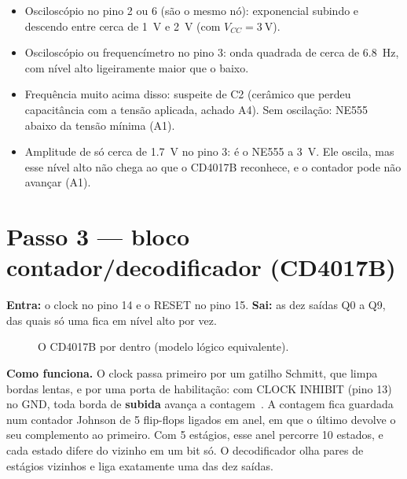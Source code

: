 \documentclass[11pt,a4paper]{article}
\begin{document}
\begin{medir}
\begin{itemize}[leftmargin=*]
  \item Osciloscópio no pino 2 ou 6 (são o mesmo nó): exponencial subindo e descendo
  entre cerca de \SI{1}{\volt} e \SI{2}{\volt} (com $V_{CC} = \SI{3}{\volt}$).
  \item Osciloscópio ou frequencímetro no pino 3: onda quadrada de cerca de
  \SI{6,8}{\hertz}, com nível alto ligeiramente maior que o baixo.
  \item Frequência muito acima disso: suspeite de C2 (cerâmico que perdeu capacitância
  com a tensão aplicada, achado A4). Sem oscilação: NE555 abaixo da tensão mínima (A1).
  \item Amplitude de só cerca de \SI{1,7}{\volt} no pino 3: é o NE555 a \SI{3}{\volt}.
  Ele oscila, mas esse nível alto não chega ao que o CD4017B reconhece, e o contador pode
  não avançar (A1).
\end{itemize}
\end{medir}

\section{Passo 3 — bloco contador/decodificador (CD4017B)}
\begin{figure}[H]
\centering
\diagramaBlocos[todosapagados, b3/.style={destaque}]
\end{figure}

\textbf{Entra:} o clock no pino 14 e o RESET no pino 15. \textbf{Sai:} as dez saídas
Q0 a Q9, das quais só uma fica em nível alto por vez.

\begin{figure}[H]
\centering
\resizebox{\linewidth}{!}{\cdInterno}
\caption{O CD4017B por dentro (modelo lógico equivalente).}
\end{figure}

\textbf{Como funciona.} O clock passa primeiro por um gatilho Schmitt, que limpa bordas
lentas, e por uma porta de habilitação: com CLOCK INHIBIT (pino 13) no GND, toda borda de
\textbf{subida} avança a contagem~\cite{cd4017}. A contagem fica guardada num contador
Johnson de 5 flip-flops ligados em anel, em que o último devolve o seu complemento ao
primeiro. Com 5 estágios, esse anel percorre 10 estados, e cada estado difere do vizinho
em um bit só. O decodificador olha pares de estágios vizinhos e liga exatamente uma das
dez saídas.
\end{document}

